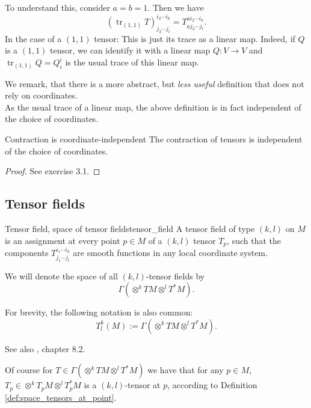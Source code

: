 \begin{colexample}{}{}
    To understand this, consider $a=b=1$. Then we have
    $$(\operatorname{tr}_{(1,1)} T)^{i_2 \cdots i_k}_{j_2 \cdots j_l} = T^{a i_2 \cdots i_k}_{a j_2 \cdots j_l}.$$
    In the case of a $(1,1)$ tensor: This is just its trace as a linear map. Indeed, if $Q$ is a $(1,1)$ tensor, we can identify it with a linear map $Q: V \to V$ and $\operatorname{tr}_{(1,1)} Q = Q^i_i$ is the usual trace of this linear map.
\end{colexample}

We remark, that there is a more abstract, but \emph{less useful} definition that does not rely on coordinates.\\

As the usual trace of a linear map, the above definition is in fact independent of the choice of coordinates.
\begin{colorlem}{Contraction is coordinate-independent}{}
The contraction of tensors is independent of the choice of coordinates.
\end{colorlem}
\begin{proof}
    See exercise 3.1.
\end{proof}




\subsection{Tensor fields}
\begin{colordef}{Tensor field, space of tensor fields}{tensor_field}
A tensor field of type $(k, l)$ on $M$ is an assignment at every point $p \in M$ of a $(k, l)$ tensor $T_p$, such that the components $T^{i_1 \cdots i_k}_{j_1 \cdots j_l}$ are smooth functions in any local coordinate system.

We will denote the space of all $(k, l)$-tensor fields by
$$\Gamma(\otimes^k TM \otimes^l T^*M).$$

For brevity, the following notation is also common:
$$T^k_l(M):=\Gamma(\otimes^k TM \otimes^l T^*M).$$

See also \cite{tsakanikas2024dg2}, chapter 8.2.
\end{colordef}

Of course for $T\in \Gamma(\otimes^k TM \otimes^l T^*M)$ we have that for any $p\in M$, $T_p\in \otimes^k T_p M \otimes^l T_p^* M$ is a $(k,l)$-tensor at $p$, according to Definition \ref{def:space_tensors_at_point}.\\


